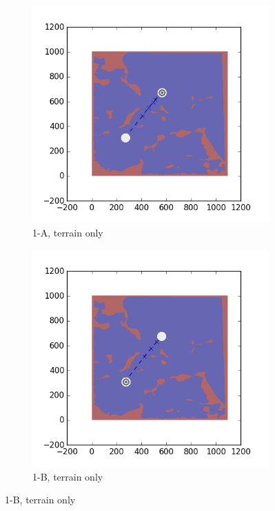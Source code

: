 \documentclass{tamuccthesis}
\begin{document}
\begin{figure}[H]
    \centering
    \begin{subfigure}[b]{0.35\textwidth}
        \centering
        \includegraphics[width=\textwidth,trim={3cm 3cm 3cm 3cm},clip]{EXP3RG_PathAa_-1_-1_0_0.png}
        \caption{{\small1-A, terrain only}}
        \label{fig:Path_1-A_terrain_only}
    \end{subfigure}
    \hfill
    \begin{subfigure}[b]{0.35\textwidth}  
        \centering 
        \includegraphics[width=\textwidth,trim={3cm 3cm 3cm 3cm},clip]{EXP3RG_PathAb_-1_-1_0_0.png}
        \caption{{\small1-B, terrain only}}   
        \label{fig:Path_1-B_terrain_only}
    \end{subfigure}
    

\end{figure}
\end{document}
